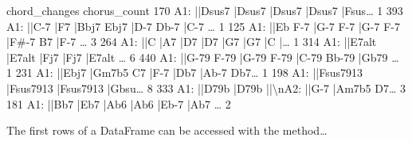 \documentclass[letterpaper,10pt,english]{sphinxmanual}
\begin{document}
{\begin{sphinxVerbatim}[commandchars=\\\{\}]
                                         chord\_changes  chorus\_count
170  A1: ||Dsus7   |Dsus7   |Dsus7   |Dsus7   |Fsus{\ldots}             1
393  A1: ||C-7   |F7   |Bbj7 Ebj7 |D-7 Db-7 |C-7   {\ldots}             1
125  A1: ||Eb F-7 |G-7 F-7 |G-7 F-7 |F\#-7 B7 |F-7  {\ldots}             3
264  A1: ||C   |A7   |D7   |D7   |G7   |G7   |C   |{\ldots}             1
314  A1: ||E7alt   |E7alt   |Fj7   |Fj7   |E7alt   {\ldots}             6
440  A1: ||G-79 F-79 |G-79 F-79 |C-79 Bb-79 |Gb79  {\ldots}             1
231  A1: ||Ebj7   |Gm7b5 C7 |F-7   |Db7   |Ab-7 Db7{\ldots}             1
198  A1: ||Fsus7913   |Fsus7913   |Fsus7913   |Gbsu{\ldots}             8
333  A1: ||D79b   |D79b   ||\textbackslash{}nA2: ||G-7   |Am7b5 D7{\ldots}             3
181  A1: ||Bb7   |Eb7   |Ab6   |Ab6   |Eb-7   |Ab7 {\ldots}             2
\end{sphinxVerbatim}
}

The first rows of a DataFrame can be accessed with the  method…

{
\begin{sphinxVerbatim}[commandchars=\\\{\}]
\llap{\color{nbsphinxin}[9]:\,\hspace{\fboxrule}\hspace{\fboxsep}}
\end{sphinxVerbatim}
}
\end{document}
